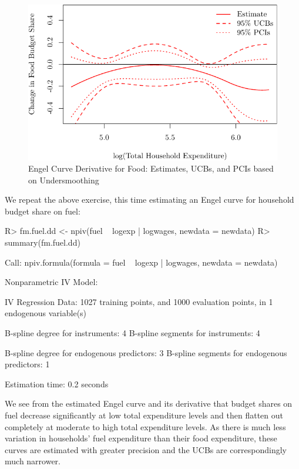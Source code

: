 \documentclass[
]{jss}
\begin{document}
\begin{figure}
\centering
\includegraphics{npiv_files/figure-latex/food-det-deriv-1.pdf}
\caption{Engel Curve Derivative for Food: Estimates, UCBs, and PCIs
based on Undersmoothing}
\end{figure}

We repeat the above exercise, this time estimating an Engel curve for
household budget share on fuel:

\begin{CodeChunk}
\begin{CodeInput}
R> fm.fuel.dd <- npiv(fuel ~ logexp | logwages, newdata = newdata)
R> summary(fm.fuel.dd)
\end{CodeInput}
\begin{CodeOutput}
Call:
npiv.formula(formula = fuel ~ logexp | logwages, newdata = newdata)

Nonparametric IV Model:

IV Regression Data: 1027 training points, and 1000 evaluation points, in 1 endogenous variable(s)

B-spline degree for instruments:             4
B-spline segments for instruments:           4

B-spline degree for endogenous predictors:   3
B-spline segments for endogenous predictors: 1

Estimation time: 0.2 seconds
\end{CodeOutput}
\end{CodeChunk}

We see from the estimated Engel curve and its derivative that budget
shares on fuel decrease significantly at low total expenditure levels
and then flatten out completely at moderate to high total expenditure
levels. As there is much less variation in households' fuel expenditure
than their food expenditure, these curves are estimated with greater
precision and the UCBs are correspondingly much narrower.
\end{document}
